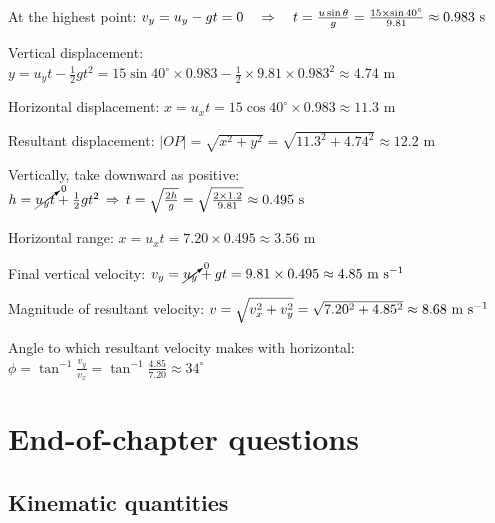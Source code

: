 \begin{soln} At the highest point: $v_y = u_y - gt = 0 \quad \Rightarrow \quad t = \frac{u\sin\theta}{g} = \frac{15\times\sin40^\circ}{9.81} \approx 0.983 \text{ s}$

Vertical displacement: $y = u_y t - \frac{1}{2}gt^2 = 15\sin40^\circ \times 0.983 - \frac{1}{2}\times 9.81 \times 0.983^2 \approx 4.74 \text{ m}$

Horizontal displacement: $x = u_x t = 15\cos40^\circ \times 0.983 \approx 11.3 \text{ m}$

Resultant displacement: $|OP| = \sqrt{x^2 +y^2} = \sqrt{11.3^2 + 4.74^2} \approx 12.2 \text{ m}$ 
\end{soln}
\newpage


\begin{soln}
    
Vertically, take downward as positive: $h = \cancelto{0}{u_y t} + \frac{1}{2}gt^2 \, \Rightarrow \, t = \sqrt{\frac{2h}{g}} = \sqrt{\frac{2\times1.2}{9.81}} \approx 0.495 \text{ s} $

Horizontal range: $x = u_x t = 7.20 \times 0.495 \approx 3.56 \text{ m}$

Final vertical velocity: $v_y = \cancelto{0}{u_y} + gt = 9.81 \times 0.495 \approx 4.85 \text{ m s$^{-1}$}$

Magnitude of resultant velocity: $v = \sqrt{v_x^2 + v_y^2} = \sqrt{7.20^2 + 4.85^2} \approx 8.68 \text{ m s$^{-1}$}$

Angle to which resultant velocity makes with horizontal: $\phi = \tan^{-1}\frac{v_y}{v_x} = \tan^{-1}\frac{4.85}{7.20} \approx 34^\circ$ 
\end{soln} 

\section{End-of-chapter questions}

\subsection*{Kinematic quantities}


